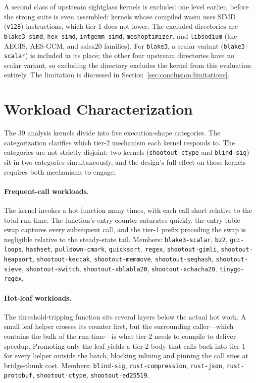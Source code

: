 A second class of upstream sightglass kernels is excluded one level earlier, before the strong suite is even assembled: kernels whose compiled wasm uses SIMD (\texttt{v128}) instructions, which tier-1 does not lower. The excluded directories are \texttt{blake3-simd}, \texttt{hex-simd}, \texttt{intgemm-simd}, \texttt{meshoptimizer}, and \texttt{libsodium} (the AEGIS, AES-GCM, and salsa20 families). For \texttt{blake3}, a scalar variant (\texttt{blake3-scalar}) is included in its place; the other four upstream directories have no scalar variant, so excluding the directory excludes the kernel from this evaluation entirely. The limitation is discussed in Section~\ref{sec:conclusion:limitations}.

\section{Workload Characterization}
\label{sec:eval:workloads}

The 39 analysis kernels divide into five execution-shape categories. The categorization clarifies which tier-2 mechanism each kernel responds to. The categories are not strictly disjoint: two kernels (\texttt{shootout-ctype} and \texttt{blind-sig}) sit in two categories simultaneously, and the design's full effect on those kernels requires both mechanisms to engage.

\paragraph{Frequent-call workloads.} The kernel invokes a hot function many times, with each call short relative to the total run-time. The function's entry counter saturates quickly, the entry-table swap captures every subsequent call, and the tier-1 prefix preceding the swap is negligible relative to the steady-state tail. Members: \texttt{blake3-scalar}, \texttt{bz2}, \texttt{gcc-loops}, \texttt{hashset}, \texttt{pulldown-cmark}, \texttt{quicksort}, \texttt{regex}, \texttt{shootout-gimli}, \texttt{shootout-heapsort}, \texttt{shootout-keccak}, \texttt{shootout-memmove}, \texttt{shootout-seqhash}, \texttt{shootout-sieve}, \texttt{shootout-switch}, \texttt{shootout-xblabla20}, \texttt{shootout-xchacha20}, \texttt{tinygo-regex}.

\paragraph{Hot-leaf workloads.} The threshold-tripping function sits several layers below the actual hot work. A small leaf helper crosses its counter first, but the surrounding caller---which contains the bulk of the run-time---is what tier-2 needs to compile to deliver speedup. Promoting only the leaf yields a tier-2 body that calls back into tier-1 for every helper outside the batch, blocking inlining and pinning the call sites at bridge-thunk cost. Members: \texttt{blind-sig}, \texttt{rust-compression}, \texttt{rust-json}, \texttt{rust-protobuf}, \texttt{shootout-ctype}, \texttt{shootout-ed25519}.

